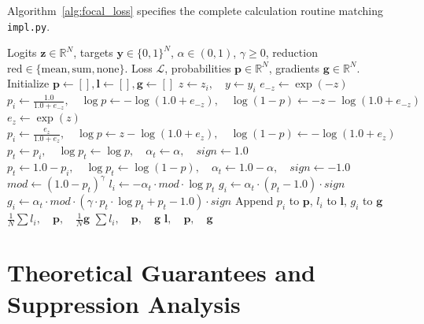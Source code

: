 \documentclass[11pt]{article}
\begin{document}
Algorithm~\ref{alg:focal_loss} specifies the complete calculation routine matching \texttt{impl.py}.

\begin{algorithm}[H]
\caption{Focal Loss Forward and Gradient Evaluation with Stable Logits}
\label{alg:focal_loss}
\begin{algorithmic}[1]
\Require Logits $\mathbf{z} \in \mathbb{R}^N$, targets $\mathbf{y} \in \{0, 1\}^N$, $\alpha \in (0, 1)$, $\gamma \ge 0$, reduction $\mathrm{red} \in \{\text{mean}, \text{sum}, \text{none}\}$.
\Ensure Loss $\mathcal{L}$, probabilities $\mathbf{p} \in \mathbb{R}^N$, gradients $\mathbf{g} \in \mathbb{R}^N$.
\State Initialize $\mathbf{p} \gets [], \mathbf{l} \gets [], \mathbf{g} \gets []$
    \State $z \gets z_i, \quad y \gets y_i$
        \State $e_{-z} \gets \exp(-z)$
        \State $p_i \gets \frac{1.0}{1.0 + e_{-z}}, \quad \log p \gets -\log(1.0 + e_{-z}), \quad \log(1-p) \gets -z - \log(1.0 + e_{-z})$
    \Else
        \State $e_z \gets \exp(z)$
        \State $p_i \gets \frac{e_z}{1.0 + e_z}, \quad \log p \gets z - \log(1.0 + e_z), \quad \log(1-p) \gets -\log(1.0 + e_z)$
    \EndIf
        \State $p_t \gets p_i, \quad \log p_t \gets \log p, \quad \alpha_t \gets \alpha, \quad sign \gets 1.0$
    \Else
        \State $p_t \gets 1.0 - p_i, \quad \log p_t \gets \log(1-p), \quad \alpha_t \gets 1.0 - \alpha, \quad sign \gets -1.0$
    \EndIf
    \State $mod \gets (1.0 - p_t)^\gamma$
    \State $l_i \gets -\alpha_t \cdot mod \cdot \log p_t$
        \State $g_i \gets \alpha_t \cdot (p_t - 1.0) \cdot sign$
    \Else
        \State $g_i \gets \alpha_t \cdot mod \cdot (\gamma \cdot p_t \cdot \log p_t + p_t - 1.0) \cdot sign$
    \EndIf
    \State Append $p_i$ to $\mathbf{p}$, $l_i$ to $\mathbf{l}$, $g_i$ to $\mathbf{g}$
\EndFor
{}
    \State \Return $\frac{1}{N}\sum l_i, \quad \mathbf{p}, \quad \frac{1}{N}\mathbf{g}$
    \State \Return $\sum l_i, \quad \mathbf{p}, \quad \mathbf{g}$
\Else
    \State \Return $\mathbf{l}, \quad \mathbf{p}, \quad \mathbf{g}$
\EndIf
\end{algorithmic}
\end{algorithm}

\section{Theoretical Guarantees and Suppression Analysis}
\label{sec:guarantees}
\end{document}
